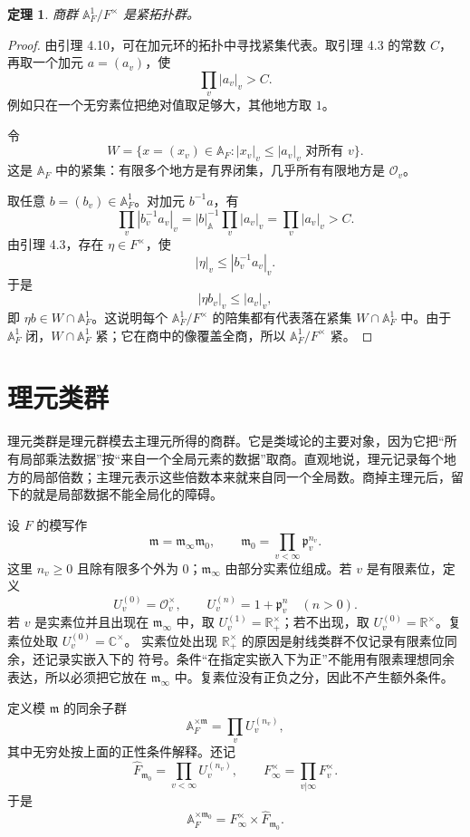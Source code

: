 \documentclass[11pt,a4paper,openany]{ctexbook}
\numberwithin{equation}{chapter}
\newcommand{\R}{\mathbb{R}}
\newcommand{\C}{\mathbb{C}}
\newcommand{\A}{\mathbb{A}}
\theoremstyle{plain}
\newtheorem{theorem}{定理}[chapter]
\theoremstyle{definition}
\theoremstyle{remark}
\begin{document}
\begin{theorem}
商群 $\A_F^1/F^\times$ 是紧拓扑群。
\end{theorem}

\begin{proof}
由引理 4.10，可在加元环的拓扑中寻找紧集代表。取引理 4.3 的常数 $C$，再取一个加元 $a=(a_v)$，使
\[
 \prod_v|a_v|_v>C.
\]
例如只在一个无穷素位把绝对值取足够大，其他地方取 $1$。

令
\[
 W=\{x=(x_v)\in\A_F: |x_v|_v\le |a_v|_v\text{ 对所有 }v\}.
\]
这是 $\A_F$ 中的紧集：有限多个地方是有界闭集，几乎所有有限地方是 $\mathcal O_v$。

取任意 $b=(b_v)\in\A_F^1$。对加元 $b^{-1}a$，有
\[
 \prod_v|b_v^{-1}a_v|_v
 =|b|_\A^{-1}\prod_v|a_v|_v
 =\prod_v|a_v|_v>C.
\]
由引理 4.3，存在 $\eta\in F^\times$，使
\[
 |\eta|_v\le |b_v^{-1}a_v|_v.
\]
于是
\[
 |\eta b_v|_v\le |a_v|_v,
\]
即 $\eta b\in W\cap\A_F^1$。这说明每个 $\A_F^1/F^\times$ 的陪集都有代表落在紧集 $W\cap\A_F^1$ 中。由于 $\A_F^1$ 闭，$W\cap\A_F^1$ 紧；它在商中的像覆盖全商，所以 $\A_F^1/F^\times$ 紧。
\end{proof}

\section{理元类群}

理元类群是理元群模去主理元所得的商群。它是类域论的主要对象，因为它把“所有局部乘法数据”按“来自一个全局元素的数据”取商。直观地说，理元记录每个地方的局部倍数；主理元表示这些倍数本来就来自同一个全局数。商掉主理元后，留下的就是局部数据不能全局化的障碍。

设 $F$ 的模写作
\[
 \mathfrak m=\mathfrak m_\infty\mathfrak m_0,\qquad
 \mathfrak m_0=\prod_{v<\infty}\mathfrak p_v^{n_v}.
\]
这里 $n_v\ge0$ 且除有限多个外为 $0$；$\mathfrak m_\infty$ 由部分实素位组成。若 $v$ 是有限素位，定义
\[
 U_v^{(0)}=\mathcal O_v^\times,\qquad
 U_v^{(n)}=1+\mathfrak p_v^n\quad(n>0).
\]
若 $v$ 是实素位并且出现在 $\mathfrak m_\infty$ 中，取 $U_v^{(1)}=\R_+^\times$；若不出现，取 $U_v^{(0)}=\R^\times$。复素位处取 $U_v^{(0)}=\C^\times$。
实素位处出现 $\R_+^\times$ 的原因是射线类群不仅记录有限素位同余，还记录实嵌入下的
符号。条件“在指定实嵌入下为正”不能用有限素理想同余表达，所以必须把它放在
$\mathfrak m_\infty$ 中。复素位没有正负之分，因此不产生额外条件。

定义模 $\mathfrak m$ 的同余子群
\[
 \A_F^{\times\mathfrak m}=\prod_v U_v^{(n_v)},
\]
其中无穷处按上面的正性条件解释。还记
\[
 \widehat F_{\mathfrak m_0}=\prod_{v<\infty}U_v^{(n_v)},\qquad
 F_\infty^\times=\prod_{v|\infty}F_v^\times.
\]
于是
\[
 \A_F^{\times\mathfrak m_0}
 =F_\infty^\times\times\widehat F_{\mathfrak m_0}.
\]
\end{document}
